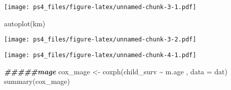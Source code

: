 \documentclass[
]{article}
\newenvironment{Shaded}{\begin{snugshade}}{\end{snugshade}}
\newcommand{\AttributeTok}[1]{\textcolor[rgb]{0.77,0.63,0.00}{#1}}
\newcommand{\ConstantTok}[1]{\textcolor[rgb]{0.00,0.00,0.00}{#1}}
\newcommand{\DecValTok}[1]{\textcolor[rgb]{0.00,0.00,0.81}{#1}}
\newcommand{\DocumentationTok}[1]{\textcolor[rgb]{0.56,0.35,0.01}{\textbf{\textit{#1}}}}
\newcommand{\FunctionTok}[1]{\textcolor[rgb]{0.00,0.00,0.00}{#1}}
\newcommand{\NormalTok}[1]{#1}
\newcommand{\OtherTok}[1]{\textcolor[rgb]{0.56,0.35,0.01}{#1}}
\newcommand{\SpecialCharTok}[1]{\textcolor[rgb]{0.00,0.00,0.00}{#1}}
\begin{document}
\texttt{[image: ps4\_files/figure-latex/unnamed-chunk-3-1.pdf]}

\begin{Shaded}
\begin{Highlighting}[]
\FunctionTok{autoplot}\NormalTok{(km)}
\end{Highlighting}
\end{Shaded}

\texttt{[image: ps4\_files/figure-latex/unnamed-chunk-3-2.pdf]}

\begin{Shaded}
\end{Shaded}

\texttt{[image: ps4\_files/figure-latex/unnamed-chunk-4-1.pdf]}

\begin{Shaded}
\begin{Highlighting}[]
\DocumentationTok{\#\#\#\#\#mage}
\NormalTok{cox\_mage }\OtherTok{\textless{}{-}} \FunctionTok{coxph}\NormalTok{(child\_surv }\SpecialCharTok{\textasciitilde{}}\NormalTok{ m.age , }\AttributeTok{data =}\NormalTok{ dat)}
\FunctionTok{summary}\NormalTok{(cox\_mage)}
\end{Highlighting}
\end{Shaded}
\end{document}
